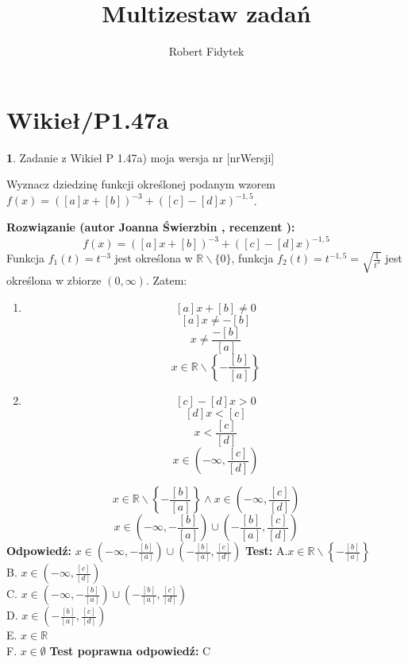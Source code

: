 \documentclass[12pt, a4paper]{article}
\title{Multizestaw zadań}
\author{Robert Fidytek}
\date{}
\theoremstyle{definition} %
\newtheorem{zad}{}
\newcommand{\kategoria}[1]{\section{#1}} %
\newcommand{\zadStart}[1]{\begin{zad}#1\newline} %
\newcommand{\zadStop}{\end{zad}}   %
\newcommand{\rozwStart}[2]{\noindent \textbf{Rozwiązanie (autor #1 , recenzent #2): }\newline} %
\newcommand{\rozwStop}{\newline}                                            %
\newcommand{\odpStart}{\noindent \textbf{Odpowiedź:}\newline}    %
\newcommand{\odpStop}{\newline}                                             %
\newcommand{\testStart}{\noindent \textbf{Test:}\newline} %
\newcommand{\testStop}{\newline} %
\newcommand{\kluczStart}{\noindent \textbf{Test poprawna odpowiedź:}\newline} %
\newcommand{\kluczStop}{\newline} %
\begin{document}
\maketitle


\kategoria{Wikieł/P1.47a}
\zadStart{Zadanie z Wikieł P 1.47a) moja wersja nr [nrWersji]}

Wyznacz dziedzinę funkcji określonej podanym wzorem \\ $f(x)=([a]x+[b])^{-3}+([c]-[d]x)^{-1,5}$.
\zadStop
\rozwStart{Joanna Świerzbin}{}
$$f(x)=([a]x+[b])^{-3}+([c]-[d]x)^{-1,5}$$
Funkcja $f_1(t)=t^{-3}$ jest określona w $\mathbb{R}\backslash \{0 \}$, funkcja $f_2(t)=t^{-1,5}=\sqrt{\frac{1}{t^3}}$ jest określona w zbiorze $(0,\infty)$. Zatem:
\begin{enumerate}
\item $$[a]x+[b] \neq 0 $$
$$[a]x \neq -[b] $$
$$x \neq \frac{-[b]}{[a]} $$
$$ x \in \mathbb{R} \backslash \left\{ -\frac{[b]}{[a]} \right\} $$

\item $$ [c]-[d]x > 0 $$
$$ [d]x < [c] $$
$$ x < \frac{[c]}{[d]} $$
$$ x \in \left( -\infty, \frac{[c]}{[d]} \right) $$

\end{enumerate}
$$ x \in \mathbb{R} \backslash \left\{ -\frac{[b]}{[a]} \right\} \land x \in \left( -\infty, \frac{[c]}{[d]} \right) $$
$$ x \in \left( -\infty, -\frac{[b]}{[a]} \right) \cup \left( -\frac{[b]}{[a]} , \frac{[c]}{[d]} \right) $$
\rozwStop
\odpStart
$ x \in \left( -\infty, -\frac{[b]}{[a]} \right) \cup \left( -\frac{[b]}{[a]} , \frac{[c]}{[d]} \right) $
\odpStop
\testStart
A.$ x \in \mathbb{R} \backslash \left\{ -\frac{[b]}{[a]} \right\}  $\\
B. $ x \in \left( -\infty, \frac{[c]}{[d]} \right) $ \\
C. $ x \in \left( -\infty, -\frac{[b]}{[a]} \right) \cup \left( -\frac{[b]}{[a]} , \frac{[c]}{[d]} \right) $ \\
D. $ x \in  \left( -\frac{[b]}{[a]} , \frac{[c]}{[d]} \right) $\\
E. $ x \in \mathbb{R} $\\
F. $ x \in \emptyset $
\testStop
\kluczStart
C
\kluczStop
\end{document}
